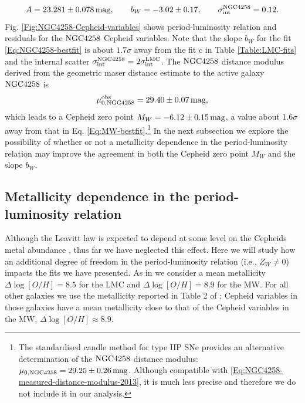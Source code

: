 \begin{equation}\label{Eq:NGC4258-bestfit}
A = 23.281 \pm 0.078\, \mathrm{mag}  , \qquad b_W = -3.02 \pm 0.17  , \qquad \sigma_{\mathrm{int}}^{\mathrm{NGC4258}} = 0.12 .
\end{equation}
Fig. \ref{Fig:NGC4258-Cepheid-variables} shows period-luminosity relation and residuals for the $\mathrm{NGC4258}$ Cepheid variables. Note that the slope $b_W$ for the fit \eqref{Eq:NGC4258-bestfit} is about $1.7\sigma$ away from the fit c in Table \ref{Table:LMC-fits} and the internal scatter $\sigma_{\mathrm{int}}^{\mathrm{NGC4258}}=2\sigma_{\mathrm{int}}^{\mathrm{LMC}}$. The $\mathrm{NGC4258}$ distance modulus derived from the geometric maser distance estimate to the active galaxy $\mathrm{NGC4258}$ \cite{Humphreys:2013eja} is 
\begin{equation}
\mu_{0,\mathrm{NGC4258}}^{\mathrm{obs}} = 29.40 \pm 0.07\, \mathrm{mag},
\label{Eq:NGC4258-measured-distance-modulus-2013}
\end{equation}
which leads to a Cepheid zero point $M_W=-6.12 \pm 0.15\, \mathrm{mag}$, a value about $1.6\sigma$ away from that in Eq. \eqref{Eq:MW-bestfit}.\footnote{The standardised candle method for type IIP SNe \cite{Polshaw:2015ika} provides an alternative determination of the $\mathrm{NGC4258}$ distance modulus:
$\mu_{0,\mathrm{NGC4258}} = 29.25 \pm 0.26\, \mathrm{mag}$. Although compatible with \eqref{Eq:NGC4258-measured-distance-modulus-2013},  it is much less precise and therefore we do not include it in our analysis. }
In the next subsection we explore the possibility of whether or not a metallicity dependence in the period-luminosity relation may improve the agreement in both the Cepheid zero point $M_W$ and the slope $b_W$. 

\subsection{Metallicity dependence in the period-luminosity relation}\label{Subsection:Zw-dependence}

Although the Leavitt law is expected to depend at some level on the Cepheids metal abundance \cite{Freedman:2010xv}, thus far we have neglected this effect. Here we will study how an additional degree of freedom in the period-luminosity relation (i.e., $Z_W \neq 0$) impacts the fits we have presented. As in \cite{Efstathiou:2013via} we consider a mean metallicity $\Delta \log[O/H]=8.5$ for the LMC and $\Delta \log[O/H]=8.9$ for the MW. For all other galaxies we use the metallicity reported in Table 2 of \cite{Riess:2011yx}; Cepheid variables in those galaxies have a mean metallicity close to that of the Cepheid variables in the MW, $\Delta \log[O/H] \approx 8.9$.

